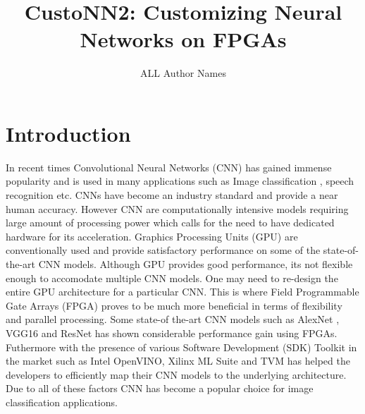 \documentclass[titlepage]{report}
\author{ALL Author Names}
\title{\textbf{CustoNN2: Customizing Neural Networks on FPGAs}}
\begin{document}
\maketitle

\tableofcontents
\newpage

\chapter{Introduction}
In recent times Convolutional Neural Networks (CNN) has gained immense popularity and is used in many applications such as Image classification , speech recognition etc. CNNs have become an industry standard and provide a near human accuracy. However CNN are computationally intensive models requiring large amount of processing power which calls for the need to have dedicated hardware for its acceleration. Graphics Processing Units (GPU) are conventionally used and provide satisfactory performance on some of the state-of-the-art CNN models. Although GPU provides good performance, its not flexible enough to accomodate multiple CNN models. One may need to re-design the entire GPU architecture for a particular CNN. This is where Field Programmable Gate Arrays (FPGA) proves to be much more beneficial in terms of flexibility and parallel processing. Some state-of the-art CNN models such as AlexNet , VGG16 and ResNet has shown considerable performance gain using FPGAs. Futhermore with the presence of various Software Development (SDK) Toolkit in the market such as Intel OpenVINO, Xilinx ML Suite and TVM has helped the developers to efficiently map their CNN models to the underlying architecture. Due to all of these factors CNN has become a popular choice for image classification applications.
\end{document}
